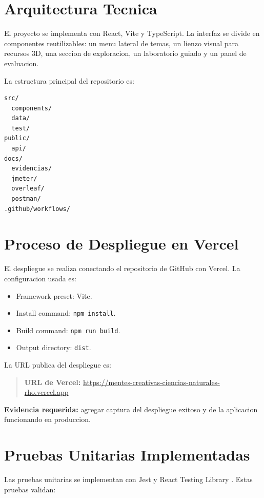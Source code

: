 \documentclass[man,12pt]{apa7}
\begin{document}
\section{Arquitectura Tecnica}

El proyecto se implementa con React, Vite y TypeScript. La interfaz se divide en componentes reutilizables: un menu lateral de temas, un lienzo visual para recursos 3D, una seccion de exploracion, un laboratorio guiado y un panel de evaluacion.

La estructura principal del repositorio es:

\begin{lstlisting}[style=codigo]
src/
  components/
  data/
  test/
public/
  api/
docs/
  evidencias/
  jmeter/
  overleaf/
  postman/
.github/workflows/
\end{lstlisting}

\section{Proceso de Despliegue en Vercel}

El despliegue se realiza conectando el repositorio de GitHub con Vercel. La configuracion usada es:

\begin{itemize}
  \item Framework preset: Vite.
  \item Install command: \texttt{npm install}.
  \item Build command: \texttt{npm run build}.
  \item Output directory: \texttt{dist}.
\end{itemize}

La URL publica del despliegue es:

\begin{quote}
\textbf{URL de Vercel:} \url{https://mentes-creativas-ciencias-naturales-rho.vercel.app}
\end{quote}

\textbf{Evidencia requerida:} agregar captura del despliegue exitoso y de la aplicacion funcionando en produccion.

\section{Pruebas Unitarias Implementadas}

Las pruebas unitarias se implementan con Jest y React Testing Library \parencite{jestDocs,testingLibraryDocs}. Estas pruebas validan:
\end{document}
